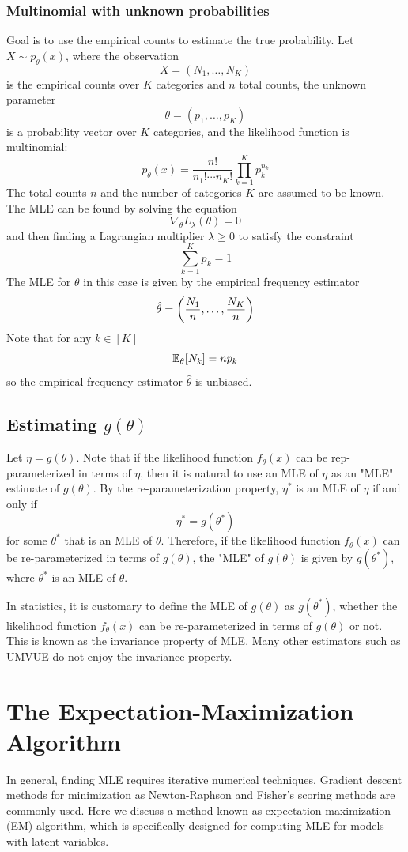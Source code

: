 \documentclass[11pt]{book}
\begin{document}
\subsection{Multinomial with unknown probabilities}
Goal is to use the empirical counts to estimate the true probability. 
Let $X\sim p_\theta(x)$, where the observation 
\[
   X = (N_1, \dots, N_K)
 \]
 is the empirical counts over $K$ categories and $n$ total counts, the unknown parameter 
 \[
   \theta = (p_1, \dots, p_K)
 \] 
 is a probability vector over $K$ categories, and the likelihood function is multinomial: 
 \[
   p_\theta(x) = \frac{n!}{n_1!\cdots n_K!} \prod_{k=1}^K{p_k^{n_k}}
  \]
  The total counts $n$ and the number of categories $K$ are assumed to be known. The MLE can be found by 
  solving the equation 
  \[
    \nabla_\theta L_\lambda (\theta) = 0 
  \] 
  and then finding a Lagrangian multiplier $\lambda \geq 0$ to satisfy the constraint 
  \[ 
    \sum_{k=1}^K p_k = 1 
  \]
  The MLE for $\theta$ in this case is given by the empirical frequency estimator 
  \[
    \hat{\theta} = \left( \frac{N_1}{n}, \dots, \frac{N_K}{n} \right)
  \] 
Note that for any $k \in [K]$ 
\[
  \mathbb{E}_\theta[N_k] = np_k 
\] 
so the empirical frequency estimator $\hat{\theta}$ is unbiased. 
\section{Estimating $g(\theta)$}
Let $\eta = g(\theta)$. Note that if the likelihood function $f_\theta(x)$ can be rep-parameterized in terms of 
$\eta$, then it is natural to use an MLE of $\eta$ as an "MLE" estimate of $g(\theta)$. By the re-parameterization 
property, $\eta^*$ is an MLE of $\eta$ if and only if 
\[
  \eta^* = g(\theta^*)
\] 
for some $\theta^*$ that is an MLE of $\theta$. Therefore, if the likelihood function $f_\theta(x)$ can be re-parameterized 
in terms of $g(\theta)$, the "MLE" of $g(\theta)$ is given by $g(\theta^*)$, where $\theta^*$ is an MLE of $\theta$. 

In statistics, it is customary to define the MLE of $g(\theta)$ as $g(\theta^*)$, whether the likelihood function $f_\theta(x)$ can be re-parameterized
in terms of $g(\theta)$ or not. This is known as the invariance property of MLE. Many other estimators 
such as UMVUE do not enjoy the invariance property. 
\chapter{The Expectation-Maximization Algorithm}
In general, finding MLE requires iterative numerical techniques. Gradient descent methods for 
minimization as Newton-Raphson and Fisher's scoring methods are commonly used. Here we discuss a method known as 
expectation-maximization (EM) algorithm, which is specifically designed for computing MLE for models with latent variables. 
\end{document}
